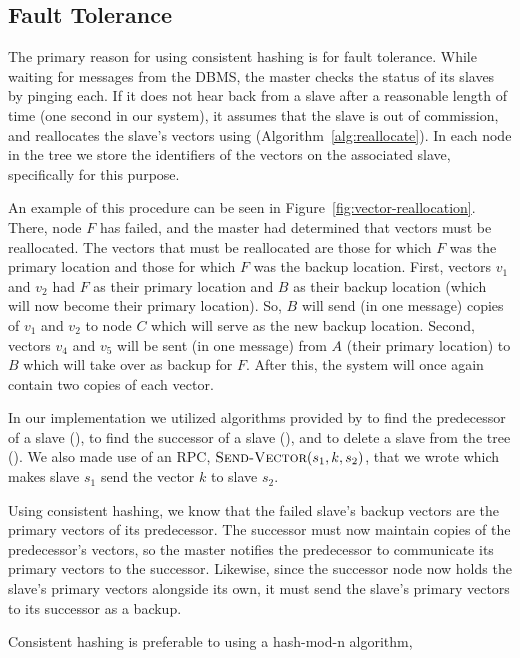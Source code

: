 \subsection{Fault Tolerance}
The primary reason for using consistent hashing is for fault tolerance. While
waiting for messages from the DBMS, the master checks the status of its slaves
by pinging each. If it does not hear back from a slave after a
reasonable length of time (one second in our system), it assumes that the slave
is out of commission, and reallocates the slave's vectors using 
(Algorithm~\ref{alg:reallocate}). In each node in the tree we store the
identifiers of the vectors on the associated slave, specifically for this
purpose.
\par
An example of this procedure can be seen in Figure~\ref{fig:vector-reallocation}. There,
node \(F\) has failed, and the master had determined that vectors must be
reallocated. The vectors that must be reallocated are those for which \(F\) was
the primary location and those for which \(F\) was the backup location. First,
vectors \(v_1\) and \(v_2\) had \(F\) as their primary location and \(B\) as
their backup location (which will now become their primary location). So, \(B\)
will send (in one message) copies of \(v_1\) and \(v_2\) to node \(C\) which
will serve as the new backup location. Second, vectors \(v_4\) and \(v_5\) will
be sent (in one message) from \(A\) (their primary location) to \(B\) which
will take over as backup for \(F\). After this, the system will once again
contain two copies of each vector.
\par
%
In our implementation we utilized algorithms provided by \cite{cormen2009}
to find the predecessor of a slave (), to find the
successor of a slave (), and to delete a slave from the
tree (). We also made use of an RPC,
\(\mathrm{\textsc{Send-Vector}}(s_1, k, s_2)\),
that we wrote which makes slave \(s_1\) send the vector \(k\) to slave \(s_2\).
\par
Using consistent hashing, we know that the failed slave's backup vectors are
the primary vectors of its predecessor. The successor must now maintain copies
of the predecessor's vectors, so the master notifies the predecessor to
communicate its primary vectors to the successor. Likewise, since the successor
node now holds the slave's primary vectors alongside its own, it must send the
slave's primary vectors to its successor as a backup.
\par
Consistent hashing is preferable to using a hash-mod-n algorithm,
